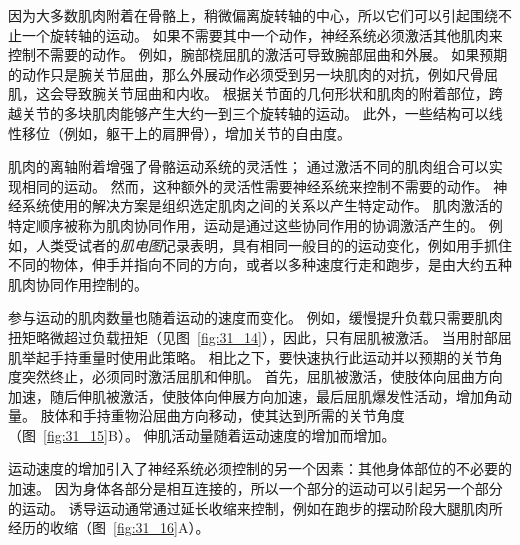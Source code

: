 因为大多数肌肉附着在骨骼上，稍微偏离旋转轴的中心，所以它们可以引起围绕不止一个旋转轴的运动。
如果不需要其中一个动作，神经系统必须激活其他肌肉来控制不需要的动作。
例如，腕部桡屈肌的激活可导致腕部屈曲和外展。
如果预期的动作只是腕关节屈曲，那么外展动作必须受到另一块肌肉的对抗，例如尺骨屈肌，这会导致腕关节屈曲和内收。
根据关节面的几何形状和肌肉的附着部位，跨越关节的多块肌肉能够产生大约一到三个旋转轴的运动。
此外，一些结构可以线性移位（例如，躯干上的肩胛骨），增加关节的自由度。


肌肉的离轴附着增强了骨骼运动系统的灵活性；
通过激活不同的肌肉组合可以实现相同的运动。
然而，这种额外的灵活性需要神经系统来控制不需要的动作。
神经系统使用的解决方案是组织选定肌肉之间的关系以产生特定动作。
肌肉激活的特定顺序被称为肌肉协同作用，运动是通过这些协同作用的协调激活产生的。
例如，人类受试者的\textit{肌电图}记录表明，具有相同一般目的的运动变化，例如用手抓住不同的物体，伸手并指向不同的方向，或者以多种速度行走和跑步，是由大约五种肌肉协同作用控制的。


参与运动的肌肉数量也随着运动的速度而变化。
例如，缓慢提升负载只需要肌肉扭矩略微超过负载扭矩（见图~\ref{fig:31_14}），因此，只有屈肌被激活。
当用肘部屈肌举起手持重量时使用此策略。
相比之下，要快速执行此运动并以预期的关节角度突然终止，必须同时激活屈肌和伸肌。
首先，屈肌被激活，使肢体向屈曲方向加速，随后伸肌被激活，使肢体向伸展方向加速，最后屈肌爆发性活动，增加角动量。
肢体和手持重物沿屈曲方向移动，使其达到所需的关节角度（图~\ref{fig:31_15}B）。 
伸肌活动量随着运动速度的增加而增加。


运动速度的增加引入了神经系统必须控制的另一个因素：其他身体部位的不必要的加速。
因为身体各部分是相互连接的，所以一个部分的运动可以引起另一个部分的运动。
诱导运动通常通过延长收缩来控制，例如在跑步的摆动阶段大腿肌肉所经历的收缩（图~\ref{fig:31_16}A）。


